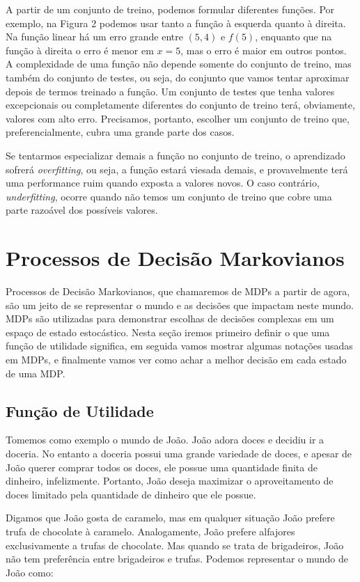 \documentclass[a4paper,10pt]{article}
\theoremstyle{plain}
\begin{document}
A partir de um conjunto de treino, podemos formular diferentes funções. Por exemplo, na Figura 2
podemos usar tanto a função à esquerda quanto à direita. Na função linear há um erro grande
entre $(5, 4)$ e $f(5)$, enquanto que na função à direita o erro é menor em $x=5$, mas o erro
é maior em outros pontos. A complexidade de uma função não depende somente do conjunto de treino,
mas também do conjunto de testes, ou seja, do conjunto que vamos tentar aproximar depois de termos
treinado a função. Um conjunto de testes que tenha valores excepcionais ou completamente diferentes
do conjunto de treino terá, obviamente, valores com alto erro. Precisamos, portanto, escolher um
conjunto de treino que, preferencialmente, cubra uma grande parte dos casos.

Se tentarmos especializar demais a função no conjunto de treino, o aprendizado sofrerá \textit{
overfitting}, ou seja, a função estará viesada demais, e provavelmente terá uma performance ruim
quando exposta a valores novos. O caso contrário, \textit{underfitting}, ocorre quando não temos
um conjunto de treino que cobre uma parte razoável dos possíveis valores.

\section{Processos de Decisão Markovianos}

Processos de Decisão Markovianos, que chamaremos de MDPs a partir de agora, são um jeito de se
representar o mundo e as decisões que impactam neste mundo. MDPs são utilizadas para demonstrar
escolhas de decisões complexas em um espaço de estado estocástico. Nesta seção iremos primeiro
definir o que uma função de utilidade significa, em seguida vamos mostrar algumas notações usadas
em MDPs, e finalmente vamos ver como achar a melhor decisão em cada estado de uma MDP.

\subsection{Função de Utilidade}

Tomemos como exemplo o mundo de João. João adora doces e decidiu ir a doceria. No entanto a doceria
possui uma grande variedade de doces, e apesar de João querer comprar todos os doces, ele possue
uma quantidade finita de dinheiro, infelizmente. Portanto, João deseja maximizar o aproveitamento
de doces limitado pela quantidade de dinheiro que ele possue.

Digamos que João gosta de caramelo, mas em qualquer situação João prefere trufa de chocolate à
caramelo. Analogamente, João prefere alfajores exclusivamente a trufas de chocolate. Mas quando
se trata de brigadeiros, João não tem preferência entre brigadeiros e trufas. Podemos representar o
mundo de João como:
\end{document}
